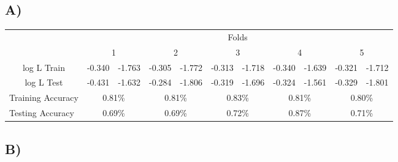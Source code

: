 \documentclass{report}
\begin{document}
\subsection*{A)}
\begin{center}
\begin{table}[h]
 \begin{tabular}{l|l|l|l|l|l|l|l|l|l|l|}
 \cline{2-11}
     & \multicolumn{10}{c|}{Folds}      \\ \cline{2-11}
     & \multicolumn{2}{c|}{1} & \multicolumn{2}{c|}{2} & \multicolumn{2}{c|}{3} & \multicolumn{2}{c|}{4} & \multicolumn{2}{c|}{5} \\ \hline
\multicolumn{1}{|c|}{log L Train} & -0.340 & -1.763 & -0.305 & -1.772 & -0.313 & -1.718 & -0.340 & -1.639 & -0.321 & -1.712 \\ \hline
\multicolumn{1}{|c|}{log L Test} & -0.431 & -1.632 & -0.284 & -1.806 & -0.319 & -1.696 & -0.324 & -1.561 & -0.329 & -1.801 \\ \hline
\multicolumn{1}{|l|}{Training Accuracy} & \multicolumn{2}{c|}{0.81\%} & \multicolumn{2}{c|}{0.81\%} & \multicolumn{2}{c|}{0.83\%} & \multicolumn{2}{c|}{0.81\%} & \multicolumn{2}{c|}{0.80\%} \\ \hline
\multicolumn{1}{|l|}{Testing Accuracy} & \multicolumn{2}{c|}{0.69\%} & \multicolumn{2}{c|}{0.69\%} & \multicolumn{2}{c|}{0.72\%} & \multicolumn{2}{c|}{0.87\%} & \multicolumn{2}{c|}{0.71\%} \\ \hline
\end{tabular}
\end{table}
\end{center}
\subsection*{B)}
\end{document}
